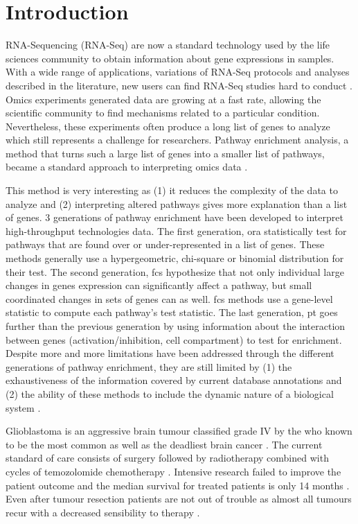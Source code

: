 \section{Introduction}

RNA-Sequencing (RNA-Seq) are now a standard technology used by the life sciences community to obtain information about gene expressions in samples.
With a wide range of applications, variations of RNA-Seq protocols and analyses described in the literature, new users can find RNA-Seq studies hard to conduct \cite*{Conesa2016}.
Omics experiments generated data are growing at a fast rate, allowing the scientific community to find mechanisms related to a particular condition.
Nevertheless, these experiments often produce a long list of genes to analyze which still represents a challenge for researchers. 
Pathway enrichment analysis, a method that turns such a large list of genes into a smaller list of pathways, became a standard approach to interpreting omics data \cite*{Reimand2019}.

This method is very interesting as (1) it reduces the complexity of the data to analyze and (2) interpreting altered pathways gives more explanation than a list of genes.
3 generations of pathway enrichment have been developed to interpret high-throughput technologies data.
The first generation, \acrfull{ora} statistically test for pathways that are found over or under-represented in a list of genes.
These methods generally use a hypergeometric, chi-square or binomial distribution for their test.
The second generation, \acrfull{fcs} hypothesize that not only individual large changes in genes expression can significantly affect a pathway, but small coordinated changes in sets of genes can as well.
\acrshort{fcs} methods use a gene-level statistic to compute each pathway's test statistic.
The last generation, \acrfull{pt} goes further than the previous generation by using information about the interaction between genes (activation/inhibition, cell compartment) to test for enrichment.
Despite more and more limitations have been addressed through the different generations of pathway enrichment, they are still limited by (1) the exhaustiveness of the information covered by current database annotations and (2) the ability of these methods to include the dynamic nature of a biological system \cite*{Khatri2012}.

Glioblastoma is an aggressive brain tumour classified grade IV by the \acrfull{who} known to be the most common as well as the deadliest brain cancer \cite*{Quinones2018,Cheng2015}.
The current standard of care consists of surgery followed by radiotherapy combined with cycles of temozolomide chemotherapy \cite*{LeRhun2019}.
Intensive research failed to improve the patient outcome and the median survival for treated patients is only 14 months \cite*{Delgado-Lopez2016}.
Even after tumour resection patients are not out of trouble as almost all tumours recur with a decreased sensibility to therapy \cite*{Campos2016}.


